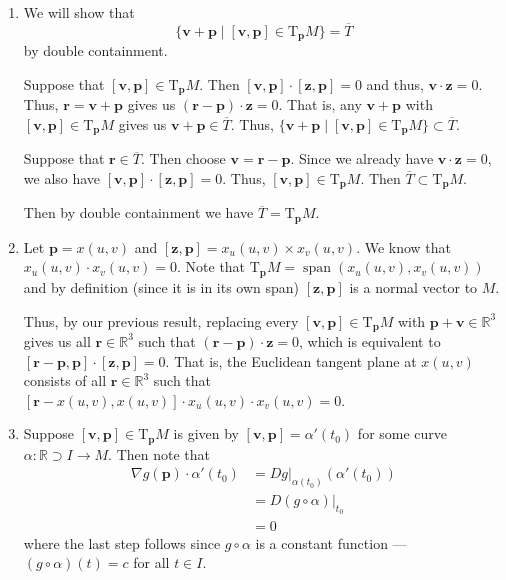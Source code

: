 \documentclass[12 pt, letterpaper]{hmcpset}
\begin{document}
\begin{solution}
	\begin{enumerate}
		\item
			We will show that
			\[
				\{ \mathbf{v} + \mathbf{p} \mid [\mathbf{v}, \mathbf{p}] \in \mathrm{T}_{\mathbf{p}} M \} = \overline{T}
			\]
			by double containment. 

			Suppose that $[\mathbf{v}, \mathbf{p}] \in \mathrm{T}_{\mathbf{p}} M$. Then $[\mathbf{v}, \mathbf{p}] \cdot [\mathbf{z}, \mathbf{p}] = 0$ and thus, $\mathbf{v} \cdot \mathbf{z} = 0$. Thus, $\mathbf{r} = \mathbf{v} + \mathbf{p}$ gives us $(\mathbf{r} - \mathbf{p}) \cdot \mathbf{z} = 0$. That is, any $\mathbf{v} + \mathbf{p}$ with $[\mathbf{v}, \mathbf{p}] \in \mathrm{T}_{\mathbf{p}}M$ gives us $\mathbf{v} + \mathbf{p} \in \overline{T}$. Thus, $\{ \mathbf{v} + \mathbf{p} \mid [\mathbf{v}, \mathbf{p}] \in \mathrm{T}_{\mathbf{p}} M \} \subset \overline{T}$. 

			Suppose that $\mathbf{r} \in \overline{T}$. Then choose $\mathbf{v} = \mathbf{r} - \mathbf{p}$. Since we already have $\mathbf{v} \cdot \mathbf{z} = 0$, we also have $[\mathbf{v}, \mathbf{p}] \cdot [\mathbf{z}, \mathbf{p}] = 0$. Thus, $[\mathbf{v}, \mathbf{p}] \in \mathrm{T}_{\mathbf{p}} M$. Then $\overline{T} \subset \mathrm{T}_{\mathbf{p}} M$. 

			Then by double containment we have $\overline{T} = \mathrm{T}_{\mathbf{p}} M$.
		\item
			Let $\mathbf{p} = x(u, v)$ and $[\mathbf{z}, \mathbf{p}] = x_{u}(u, v) \times x_{v}(u, v)$. We know that $x_{u}(u, v) \cdot x_{v}(u, v) = 0$. Note that $\mathrm{T}_{\mathbf{p}} M = \operatorname{span}(x_{u}(u, v), x_{v}(u, v))$ and by definition (since it is in its own span) $[\mathbf{z}, \mathbf{p}]$ is a normal vector to $M$. 

			Thus, by our previous result, replacing every $[\mathbf{v}, \mathbf{p}] \in \mathrm{T}_{\mathbf{p}} M$ with $\mathbf{p} + \mathbf{v} \in \mathbb{R}^{3}$ gives us all $\mathbf{r} \in \mathbb{R}^{3}$ such that $(\mathbf{r} - \mathbf{p}) \cdot \mathbf{z} = 0$, which is equivalent to $[\mathbf{r} - \mathbf{p}, \mathbf{p}] \cdot [\mathbf{z}, \mathbf{p}] = 0$. That is, the Euclidean tangent plane at $x(u, v)$ consists of all $\mathbf{r} \in \mathbb{R}^{3}$ such that $[\mathbf{r} - x(u, v), x(u, v)] \cdot x_{u}(u, v) \cdot x_{v}(u, v) = 0$.
		\item
			Suppose $[\mathbf{v}, \mathbf{p}] \in \mathrm{T}_{\mathbf{p}} M$ is given by $[\mathbf{v}, \mathbf{p}] = \alpha'(t_{0})$ for some curve $\alpha : \mathbb{R} \supset I \to M$. Then note that \[
				\begin{split}
					\nabla g(\mathbf{p}) \cdot \alpha'(t_{0}) & = D g \Big |_{\alpha(t_{0})} (\alpha'(t_{0})) \\
										  & = D (g \circ \alpha) \Big |_{t_{0}} \\
										  & = 0
				\end{split}
			\]
			where the last step follows since $g \circ \alpha$ is a constant function --- $(g \circ \alpha)(t) = c$ for all $t \in I$. 


\end{enumerate}
\end{solution}
\end{document}
